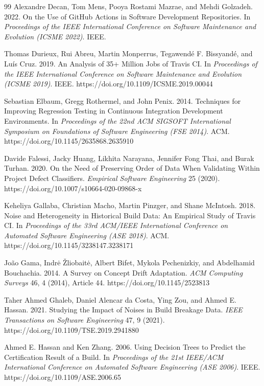 \documentclass[sigconf,review,anonymous,nonacm]{acmart}
\begin{document}
\begin{thebibliography}{99}
Alexandre Decan, Tom Mens, Pooya Rostami Mazrae, and Mehdi Golzadeh. 2022.
On the Use of GitHub Actions in Software Development Repositories.
In \textit{Proceedings of the IEEE International Conference on Software Maintenance and Evolution (ICSME 2022)}. IEEE.

Thomas Durieux, Rui Abreu, Martin Monperrus, Tegawend\'{e} F. Bissyand\'{e}, and Lu\'{i}s Cruz. 2019.
An Analysis of 35+ Million Jobs of Travis CI.
In \textit{Proceedings of the IEEE International Conference on Software Maintenance and Evolution (ICSME 2019)}. IEEE. https://doi.org/10.1109/ICSME.2019.00044

Sebastian Elbaum, Gregg Rothermel, and John Penix. 2014.
Techniques for Improving Regression Testing in Continuous Integration Development Environments.
In \textit{Proceedings of the 22nd ACM SIGSOFT International Symposium on Foundations of Software Engineering (FSE 2014)}. ACM. https://doi.org/10.1145/2635868.2635910

Davide Falessi, Jacky Huang, Likhita Narayana, Jennifer Fong Thai, and Burak Turhan. 2020.
On the Need of Preserving Order of Data When Validating Within Project Defect Classifiers.
\textit{Empirical Software Engineering} 25 (2020). https://doi.org/10.1007/s10664-020-09868-x

Keheliya Gallaba, Christian Macho, Martin Pinzger, and Shane McIntosh. 2018.
Noise and Heterogeneity in Historical Build Data: An Empirical Study of Travis CI.
In \textit{Proceedings of the 33rd ACM/IEEE International Conference on Automated Software Engineering (ASE 2018)}. ACM. https://doi.org/10.1145/3238147.3238171

Jo\~{a}o Gama, Indr\.{e} \v{Z}liobait\.{e}, Albert Bifet, Mykola Pechenizkiy, and Abdelhamid Bouchachia. 2014.
A Survey on Concept Drift Adaptation.
\textit{ACM Computing Surveys} 46, 4 (2014), Article 44. https://doi.org/10.1145/2523813

Taher Ahmed Ghaleb, Daniel Alencar da Costa, Ying Zou, and Ahmed E. Hassan. 2021.
Studying the Impact of Noises in Build Breakage Data.
\textit{IEEE Transactions on Software Engineering} 47, 9 (2021). https://doi.org/10.1109/TSE.2019.2941880

Ahmed E. Hassan and Ken Zhang. 2006.
Using Decision Trees to Predict the Certification Result of a Build.
In \textit{Proceedings of the 21st IEEE/ACM International Conference on Automated Software Engineering (ASE 2006)}. IEEE. https://doi.org/10.1109/ASE.2006.65


\end{thebibliography}
\end{document}
